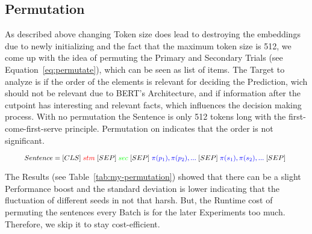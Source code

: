 \subsection{Permutation}
As described above changing Token size does lead to destroying the embeddings due to newly
initializing and the fact that the maximum token size is 512, we come up with the idea
of permuting the Primary and Secondary Trials (see Equation~\ref{eq:permutate}), which can be seen as list of items.
The Target to analyze is if the order of the elements is relevant for deciding the Prediction, 
wich should not be relevant due to BERT's Architecture, and
if information after the cutpoint has interesting and relevant facts, which influences
the decision making process. With no permutation the 
Sentence is only 512 tokens long with the first-come-first-serve principle. Permutation on
indicates that the order is not significant.

\begin{equation}\label{eq:permutate}
    \resizebox{0.91\hsize}{!}{%
     $Sentence = [CLS] \; \textcolor{red}{stm}\;
                 [SEP] \; \textcolor{green}{sec}\;
                 [SEP] \; \textcolor{blue}{\pi(p_1), \pi(p_2), ... }\;
                 [SEP] \; \textcolor{blue}{\pi(s_1), \pi(s_2), ... }\;
                 [SEP]$      
    }
\end{equation}


The Results (see Table~\ref{tab:my-permutation}) showed that there can be a slight Performance boost and the standard deviation is lower
indicating that the fluctuation of different seeds in not that harsh. But, the Runtime cost of permuting the
sentences every Batch is for the later Experiments too much. Therefore, we skip it to stay cost-efficient.

